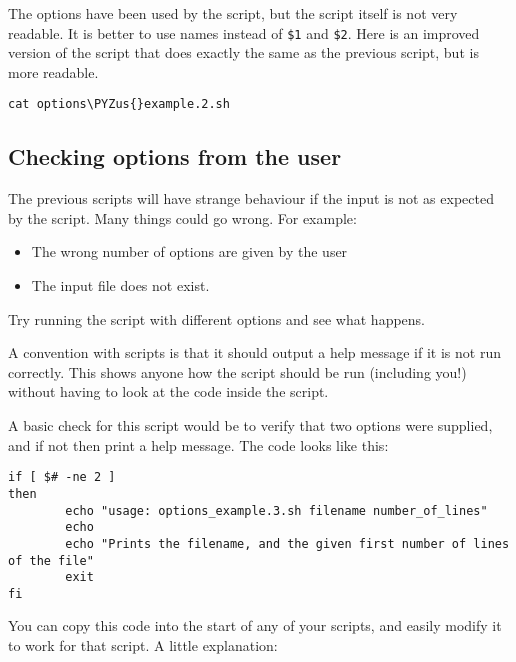 \documentclass[11pt]{article}
\makeatletter
\providecommand{\tightlist}{%
      \setlength{\itemsep}{0pt}\setlength{\parskip}{0pt}}
\def\PYZus{\char`\_}
\newcommand{\boxspacing}{\kern\kvtcb@left@rule\kern\kvtcb@boxsep}
\newcommand{\prompt}[4]{
        {\ttfamily\llap{{\color{blue}\LARGE\faKeyboardO\hspace{3pt}#4}}\vspace{-\baselineskip}}
    }
\makeatother
\begin{document}
    The options have been used by the script, but the script itself is not
very readable. It is better to use names instead of \texttt{\$1} and
\texttt{\$2}. Here is an improved version of the script that does
exactly the same as the previous script, but is more readable.

    \begin{tcolorbox}[breakable, size=fbox, boxrule=1pt, pad at break*=1mm,colback=cellbackground, colframe=cellborder]
\prompt{In}{incolor}{ }{\boxspacing}
\begin{Verbatim}[commandchars=\\\{\}]
cat options\PYZus{}example.2.sh
\end{Verbatim}
\end{tcolorbox}

    \hypertarget{checking-options-from-the-user}{%
\subsection{Checking options from the
user}\label{checking-options-from-the-user}}

The previous scripts will have strange behaviour if the input is not as
expected by the script. Many things could go wrong. For example:

\begin{itemize}
\tightlist
\item
  The wrong number of options are given by the user
\item
  The input file does not exist.
\end{itemize}

Try running the script with different options and see what happens.

A convention with scripts is that it should output a help message if it
is not run correctly. This shows anyone how the script should be run
(including you!) without having to look at the code inside the script.

A basic check for this script would be to verify that two options were
supplied, and if not then print a help message. The code looks like
this:

\begin{verbatim}
if [ $# -ne 2 ]
then
        echo "usage: options_example.3.sh filename number_of_lines"
        echo
        echo "Prints the filename, and the given first number of lines of the file"
        exit
fi
\end{verbatim}

You can copy this code into the start of any of your scripts, and easily
modify it to work for that script. A little explanation:
\end{document}
